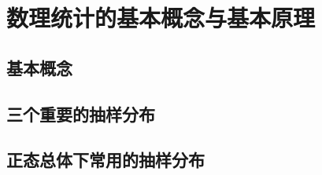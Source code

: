 \chapter{数理统计的基本概念与基本原理}

\section{基本概念}
\label{sec:基本概念}

\section{三个重要的抽样分布}
\label{sec:三个重要的抽样分布}

\section{正态总体下常用的抽样分布}
\label{sec:正态总体下常用的抽样分布}


